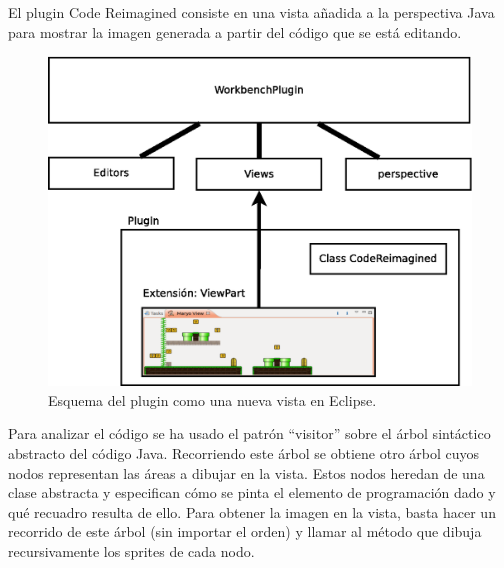 \documentclass{llncs}
\begin{document}
El plugin Code Reimagined consiste en una vista añadida a la perspectiva Java para mostrar la imagen generada a partir del código que se está editando. 

\begin{figure}[ht]
\begin{center}
\includegraphics[scale=0.3]{images/crplugin.eps}
\caption{Esquema del plugin como una nueva vista en Eclipse.
\label{fig:crplugin}}
\end{center}
\end{figure}

Para analizar el código se ha usado el patrón ``visitor'' sobre el árbol sintáctico abstracto del código Java. Recorriendo este árbol se obtiene otro árbol cuyos nodos representan las áreas a dibujar en la vista. Estos nodos heredan de una clase abstracta y especifican cómo se pinta el elemento de programación dado y qué recuadro resulta de ello. Para obtener la imagen en la vista, basta hacer un recorrido de este árbol (sin importar el orden) y llamar al método que dibuja recursivamente los sprites de cada nodo. 
\end{document}
